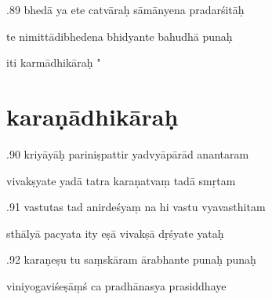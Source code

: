 \documentclass[article,12pt,a4paper]{memoir}%
\newcounter{parCount}
\begin{document}
	  
	  \pstart {}.89 bhedā ya ete catvāraḥ sāmānyena pradarśitāḥ 
	{}
	\pend%
      

	  
	  \pstart \leavevmode%
	te nimittādibhedena bhidyante bahudhā punaḥ 
	{}
	\pend%
      

	  
	  \pstart \leavevmode%
	iti karmādhikāraḥ "
	{}
	\pend%
      
	  
	
\chapter[{karaṇādhikāraḥ}][{karaṇādhikāraḥ}]{ karaṇādhikāraḥ}

	  
	  \pstart {}.90 kriyāyāḥ pariniṣpattir yadvyāpārād anantaram 
	{}
	\pend%
      

	  
	  \pstart \leavevmode%
	vivakṣyate yadā tatra karaṇatvaṃ tadā smṛtam 
	{}
	\pend%
      

	  
	  \pstart {}.91 vastutas tad anirdeśyaṃ na hi vastu vyavasthitam 
	{}
	\pend%
      

	  
	  \pstart \leavevmode%
	sthālyā pacyata ity eṣā vivakṣā dṛśyate yataḥ 
	{}
	\pend%
      

	  
	  \pstart {}.92 karaṇeṣu tu saṃskāram ārabhante punaḥ punaḥ 
	{}
	\pend%
      

	  
	  \pstart \leavevmode%
	viniyogaviśeṣāṃś ca pradhānasya prasiddhaye 
	{}
	\pend%
      
\end{document}
